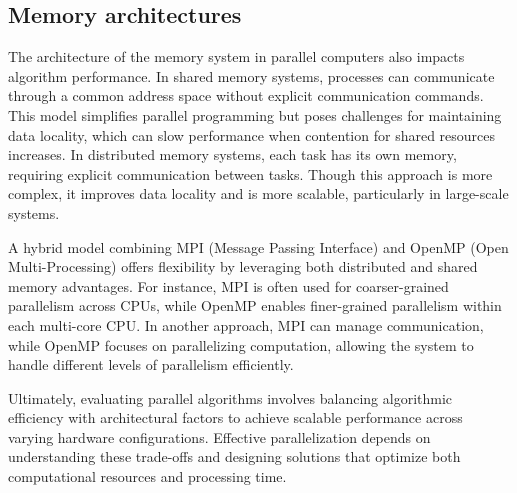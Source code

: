 \subsection{Memory architectures}
The architecture of the memory system in parallel computers also impacts algorithm performance. 
In shared memory systems, processes can communicate through a common address space without explicit communication commands. 
This model simplifies parallel programming but poses challenges for maintaining data locality, which can slow performance when contention for shared resources increases. 
In distributed memory systems, each task has its own memory, requiring explicit communication between tasks. 
Though this approach is more complex, it improves data locality and is more scalable, particularly in large-scale systems.

A hybrid model combining MPI (Message Passing Interface) and OpenMP (Open Multi-Processing) offers flexibility by leveraging both distributed and shared memory advantages. 
For instance, MPI is often used for coarser-grained parallelism across CPUs, while OpenMP enables finer-grained parallelism within each multi-core CPU. 
In another approach, MPI can manage communication, while OpenMP focuses on parallelizing computation, allowing the system to handle different levels of parallelism efficiently.

Ultimately, evaluating parallel algorithms involves balancing algorithmic efficiency with architectural factors to achieve scalable performance across varying hardware configurations.
Effective parallelization depends on understanding these trade-offs and designing solutions that optimize both computational resources and processing time.